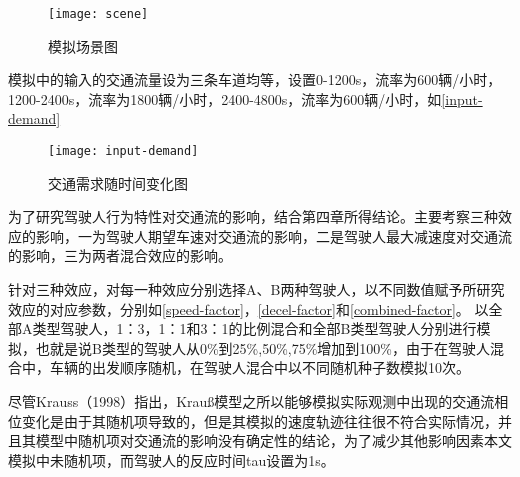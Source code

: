 \begin{figure}[!htb]
\begin{center}
\texttt{[image: scene]}
\end{center}
\caption{模拟场景图}
\label{scene}
\end{figure}

模拟中的输入的交通流量设为三条车道均等，设置0-1200s，流率为600辆/小时，1200-2400s，流率为1800辆/小时，2400-4800s，流率为600辆/小时，如\autoref{input-demand}

\begin{figure}[!htb]
\begin{center}
\texttt{[image: input-demand]}
\end{center}
\caption{交通需求随时间变化图}
\label{input-demand}
\end{figure}

为了研究驾驶人行为特性对交通流的影响，结合第四章所得结论。主要考察三种效应的影响，一为驾驶人期望车速对交通流的影响，二是驾驶人最大减速度对交通流的影响，三为两者混合效应的影响。



针对三种效应，对每一种效应分别选择A、B两种驾驶人，以不同数值赋予所研究效应的对应参数，分别如\autoref{speed-factor}，\autoref{decel-factor}和\autoref{combined-factor}。
以全部A类型驾驶人，1：3，1：1和3：1的比例混合和全部B类型驾驶人分别进行模拟，也就是说B类型的驾驶人从0\%到25\%,50\%,75\%增加到100\%，由于在驾驶人混合中，车辆的出发顺序随机，在驾驶人混合中以不同随机种子数模拟10次。

尽管Krauss（1998）\cite{Krauss1998}指出，Krauß模型之所以能够模拟实际观测中出现的交通流相位变化是由于其随机项导致的，但是其模拟的速度轨迹往往很不符合实际情况，并且其模型中随机项对交通流的影响没有确定性的结论，为了减少其他影响因素本文模拟中未随机项，而驾驶人的反应时间tau设置为1s。

